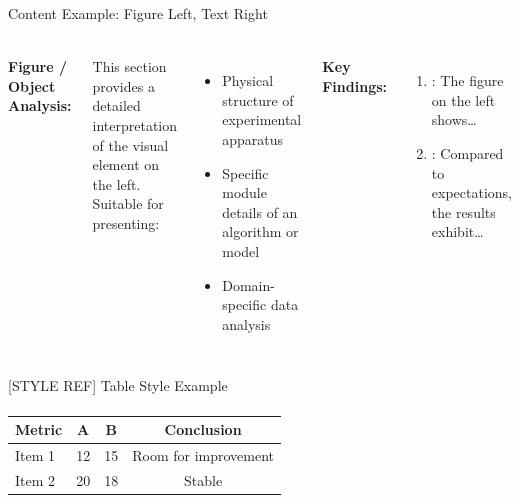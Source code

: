 \documentclass[aspectratio=169,10pt,xcolor=table]{beamer}
\begin{document}
\begin{frame}{Content Example: Figure Left, Text Right}
\framesubtitle{} 
\small
\begin{columns}[c] %

    \centering
    
    \textbf{Figure / Object Analysis:}
    
    This section provides a detailed interpretation of the visual element
    on the left. Suitable for presenting:
    \begin{itemize}
        \item Physical structure of experimental apparatus
        \item Specific module details of an algorithm or model
        \item Domain-specific data analysis
    \end{itemize}

    \vspace{1em}
    \textbf{Key Findings:}
    \begin{enumerate}
        \item {}: The figure on the left shows\ldots
        \item {}: Compared to expectations, the results exhibit\ldots
    \end{enumerate}
\end{columns}
\end{frame}

\begin{frame}{[STYLE REF] Table Style Example}
\framesubtitle{}
\small
\centering
\renewcommand{\arraystretch}{1.15}
\footnotesize
{}
\begin{tabular}{p{} c c c}
\toprule
Metric & A & B & Conclusion \\
\midrule
Item 1 & 12 & 15 & Room for improvement \\
Item 2 & 20 & 18 & Stable \\
\bottomrule
\end{tabular}
\end{frame}
\end{document}
